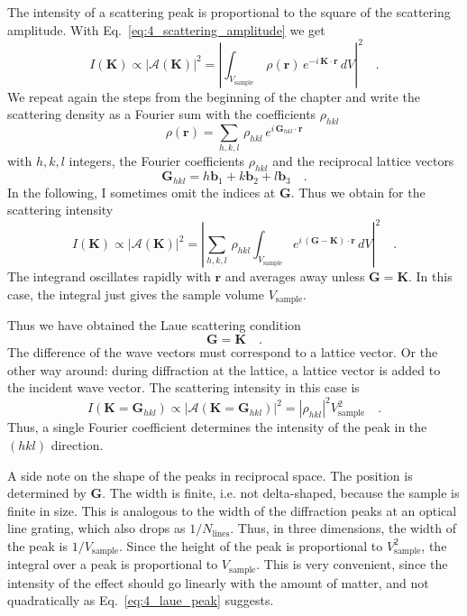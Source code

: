 The intensity of a scattering peak is proportional to the square of the scattering amplitude. With Eq.~\ref{eq:4_scattering_amplitude} we get
\begin{equation}
I(\mathbf{K}) \propto \left| \mathcal{A}(\mathbf{K}) \right|^2 
= \left| \int_{V_\text{sample}} \, \rho( \mathbf{r}) \, e^{- i \, \mathbf{K} \cdot \mathbf{r}} \, dV \right|^2 \quad .
\end{equation}
We repeat again the steps from the beginning of the chapter and write the scattering density as a Fourier sum with the coefficients $\rho_{hkl}$
\begin{equation}
  \rho(\mathbf{r}) = \sum_{h,k,l} \, \rho_{hkl} \, e^{i \, \mathbf{G}_{hkl} \cdot \mathbf{r}}
\end{equation}
with $h,k,l$ integers, the Fourier coefficients $\rho_{hkl}$ and the reciprocal lattice vectors
\begin{equation}
\mathbf{G}_{hkl} = h \mathbf{b}_1 + k \mathbf{b}_2 + l \mathbf{b}_3 \quad .
\end{equation}
In the following, I sometimes omit the indices at $\mathbf{G}$. Thus we obtain for the scattering intensity 
\begin{equation}
I(\mathbf{K}) \propto \left| \mathcal{A}(\mathbf{K}) \right|^2 
= \left| 
 \sum_{h,k,l} \, \rho_{hkl}
  \int_{V_\text{sample}} e^{ i \, (\mathbf{G}- \mathbf{K} )\cdot \mathbf{r}} \, dV \right|^2 \quad .
\end{equation}
The integrand oscillates rapidly with $\mathbf{r}$ and averages away unless $\mathbf{G} = \mathbf{K}$. In this case, the integral just gives the sample volume $V_\text{sample}$.

Thus we have obtained the Laue scattering condition
\begin{equation}
\mathbf{G} = \mathbf{K} \quad .
\end{equation}
The difference of the wave vectors must correspond to a lattice vector. Or the other way around: during diffraction at the lattice, a lattice vector is added to the incident wave vector.  The scattering intensity in this case is
\begin{equation}
I(\mathbf{K} = \mathbf{G}_{hkl} ) \propto \left| \mathcal{A}(\mathbf{K} = \mathbf{G}_{hkl} ) \right|^2 
= \left| \rho_{hkl} \right|^2 V_\text{sample}^2 \quad . \label{eq:4_laue_peak}
\end{equation}
Thus, a single Fourier coefficient determines the intensity of the peak in the $(hkl)$ direction.


A side note on the shape of the peaks in reciprocal space. The position is determined by $\mathbf{G}$. The width is finite, i.e. not delta-shaped, because the sample is finite in size. This is analogous to the width of the diffraction peaks at an optical line grating, which also drops as $1/N_\text{lines}$. Thus, in three dimensions, the width of the peak is $1/V_\text{sample}$. Since the height of the peak is proportional to $ V_\text{sample}^2$, the integral over a peak is proportional to $V_\text{sample}$. This is very convenient, since the intensity of the effect should go linearly with the  amount of matter, and not quadratically as Eq.~\ref{eq:4_laue_peak} suggests.


